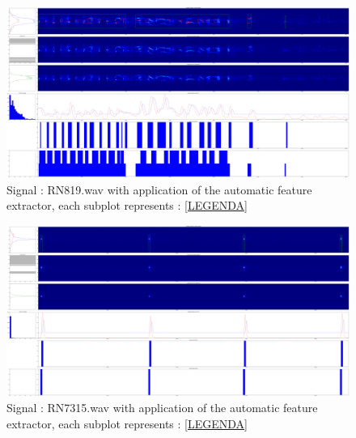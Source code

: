 \documentclass[a4paper]{report}
\begin{document}
\begin{figure}[H]
\begin{center}
\includegraphics[scale=0.07]{7test.png}\caption{Signal : RN819.wav with application of the automatic feature extractor, each subplot represents : \ref{LEGENDA} }
\end{center}
\end{figure}

\begin{figure}[H]
\begin{center}
\includegraphics[scale=0.07]{8test.png}\caption{Signal : RN7315.wav with application of the automatic feature extractor, each subplot represents : \ref{LEGENDA} }
\end{center}
\end{figure}
\fi
\end{document}
